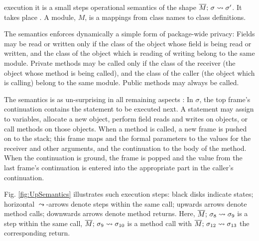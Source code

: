  \LangOO execution it is a small steps operational semantics of the shape $\overline{M};\, \sigma \leadsto {\sigma'}$.
 It takes place .
 A module,  $M$, is a mappings from class names to class definitions. 
   
The semantics enforces dynamically a simple form of package-wide privacy: 
Fields may be read or written only if the class of the object whose field is being read or written, and the class of the object which is reading of writing belong to the same module.
Private methods may be called only if the class of the receiver (the object whose method is being called), and the class of the caller (the object which is calling) belong to the same module.
Public methods may always be called.

The semantics is as un-surprising in  all remaining aspects  :  
In $\sigma$, the  top frame's continuation contains the statement to be  executed next.  
 A statement may assign to variables, allocate a new object, 
perform field reads and writes on objects,  or
 call methods on those objects. 
When a method is called, a new frame is pushed on to the stack; this frame  maps  and the formal parameters to  the values for the receiver and other arguments, and the continuation to the body of the method.  When the continuation is ground, the frame is popped and the value from the last frame's continuation is entered into the appropriate part in the caller's continuation. 


{Fig. \ref{fig:UpSemantics} illustrates  such  execution steps:  black disks indicate states;
 horizontal $\leadsto$-arrows denote   steps  within the same  call; upwards arrows denote  method calls;
 downwards arrows denote method returns. %
 Here,   $\overline{M};\, \sigma_8 \leadsto {\sigma_9} $ is a step within the same call, $\overline{M};\, \sigma_9 \leadsto {\sigma_{10}} $ is a method call   
with $\overline{M};\, \sigma_{12} \leadsto {\sigma_{13}} $ %
the corresponding return. 
} 

